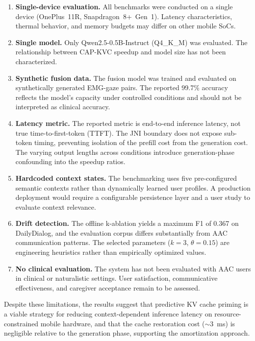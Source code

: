 \begin{enumerate}
    \item \textbf{Single-device evaluation.} All benchmarks were conducted on a single device (OnePlus~11R, Snapdragon~8+~Gen~1). Latency characteristics, thermal behavior, and memory budgets may differ on other mobile SoCs.

    \item \textbf{Single model.} Only Qwen2.5-0.5B-Instruct (Q4\_K\_M) was evaluated. The relationship between CAP-KVC speedup and model size has not been characterized.

    \item \textbf{Synthetic fusion data.} The fusion model was trained and evaluated on synthetically generated EMG-gaze pairs. The reported 99.7\% accuracy reflects the model's capacity under controlled conditions and should not be interpreted as clinical accuracy.

    \item \textbf{Latency metric.} The reported metric is end-to-end inference latency, not true time-to-first-token (TTFT). The JNI boundary does not expose sub-token timing, preventing isolation of the prefill cost from the generation cost. The varying output lengths across conditions introduce generation-phase confounding into the speedup ratios.

    \item \textbf{Hardcoded context states.} The benchmarking uses five pre-configured semantic contexts rather than dynamically learned user profiles. A production deployment would require a configurable persistence layer and a user study to evaluate context relevance.

    \item \textbf{Drift detection.} The offline k-ablation yields a maximum F1 of 0.367 on DailyDialog, and the evaluation corpus differs substantially from AAC communication patterns. The selected parameters ($k = 3$, $\theta = 0.15$) are engineering heuristics rather than empirically optimized values.

    \item \textbf{No clinical evaluation.} The system has not been evaluated with AAC users in clinical or naturalistic settings. User satisfaction, communicative effectiveness, and caregiver acceptance remain to be assessed.
\end{enumerate}

Despite these limitations, the results suggest that predictive KV cache priming is a viable strategy for reducing context-dependent inference latency on resource-constrained mobile hardware, and that the cache restoration cost ($\sim$3~ms) is negligible relative to the generation phase, supporting the amortization approach.
